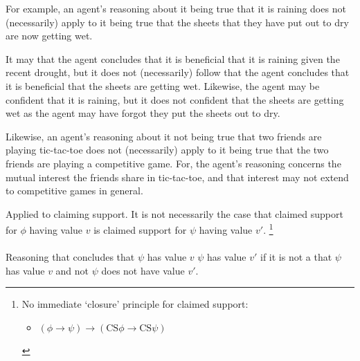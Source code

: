 \begin{note}
  For example, an agent's reasoning about it being true that it is raining does not (necessarily) apply to it being true that the sheets that they have put out to dry are now getting wet.

  It may that the agent concludes that it is beneficial that it is raining given the recent drought, but it does not (necessarily) follow that the agent concludes that it is beneficial that the sheets are getting wet.
  Likewise, the agent may be confident that it is raining, but it does not confident that the sheets are getting wet as the agent may have forgot they put the sheets out to dry.

  Likewise, an agent's reasoning about it not being true that two friends are playing tic-tac-toe does not (necessarily) apply to it being true that the two friends are playing a competitive game.
  For, the agent's reasoning concerns the mutual interest the friends share in tic-tac-toe, and that interest may not extend to competitive games in general.
\end{note}

\begin{note}
  Applied to claiming support.
  It is not necessarily the case that claimed support for \(\phi\) having value \(v\) is claimed support for \(\psi\) having value \(v'\).\nolinebreak
  \footnote{
    No immediate `closure' principle for claimed support:
    \begin{itemize}
    \item \((\phi \rightarrow \psi) \rightarrow (\text{CS}\phi \rightarrow \text{CS}\psi)\)
    \end{itemize}
  }
\end{note}

\paragraph{}

\begin{note}
  \begin{definition}[\indicateO{1}]
    Reasoning that concludes that \(\psi\) has value \(v\)  \(\psi\) has value \(v'\) if it is not a \ep{} that \(\psi\) has value \(v\) and not \(\psi\) does not have value \(v'\).
  \end{definition}
\end{note}

